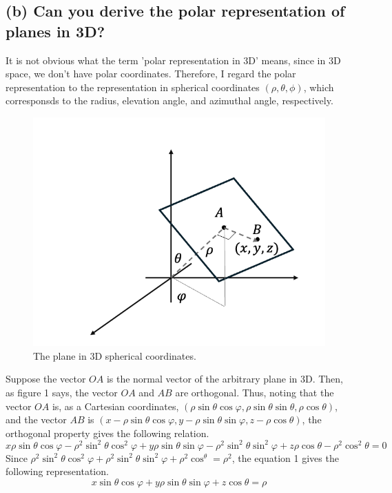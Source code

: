 \documentclass[10pt]{article}
\begin{document}
\subsection*{(b) Can you derive the polar representation of planes in 3D?}
It is not obvious what the term 'polar representation in 3D' means, since in 3D space, we don't have polar coordinates. 
Therefore, I regard the polar representation to the representation in spherical coordinates $(\rho,\theta, \phi)$, which corresponsds to the radius, elevation angle, and azimuthal angle, respectively.
\begin{figure}[!h]
    \begin{center}
        \includegraphics*[scale = 0.3]{./fig1.png}
    \end{center}
    \caption{The plane in 3D spherical coordinates.}
\end{figure}
Suppose the vector $OA$ is the normal vector of the arbitrary plane in 3D. Then, as figure 1 says, the vector $OA$ and $AB$ are orthogonal. 
Thus, noting that the vector $OA$ is, as a Cartesian coordinates, $(\rho \sin\theta\cos\varphi, \rho\sin\theta\sin\theta, \rho\cos\theta)$,
and the vector $AB$ is $(x - \rho \sin\theta\cos\varphi,y - \rho\sin\theta\sin\varphi,z - \rho\cos\theta)$, the orthogonal property gives the following relation.
\begin{equation}
    x\rho\sin\theta\cos\varphi - \rho^2\sin^2\theta\cos^2\varphi + y\rho\sin\theta\sin\varphi - \rho^2\sin^2\theta\sin^2\varphi + z\rho\cos\theta - \rho^2\cos^2\theta = 0
\end{equation}
Since $\rho^2\sin^2\theta\cos^2\varphi + \rho^2\sin^2\theta\sin^2\varphi + \rho^2\cos^\theta = \rho^2$, the equation 1 gives the following representation.
\begin{equation}
    x\sin\theta\cos\varphi + y\rho\sin\theta\sin\varphi + z\cos\theta= \rho
\end{equation}
\end{document}
